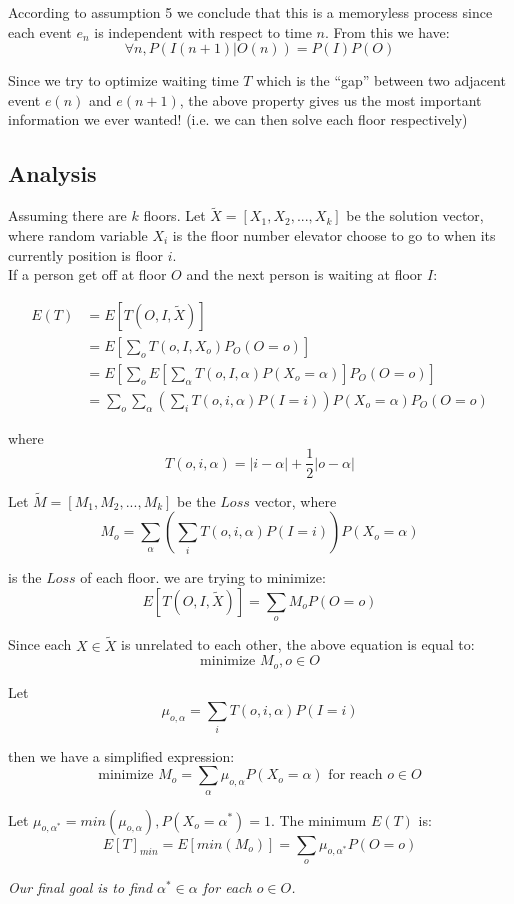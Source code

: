 \documentclass[11pt]{article}
\begin{document}
According to assumption 5 we conclude that this is a memoryless process since each event $e_n$ is independent with respect to time $n$. From this we have:
$$\forall n, P(I(n+1)|O(n))=P(I)P(O)$$

Since we try to optimize waiting time $T$ which is the ``gap'' between two adjacent event $e(n)$ and $e(n+1)$, the above property gives us the most important information we ever wanted! (i.e. we can then solve each floor respectively)

\subsection{Analysis}
Assuming there are $k$ floors. Let $\tilde{X}=[X_1,X_2,...,X_k]$ be the solution vector, where random variable $X_i$ is the floor number elevator choose to go to when its currently position is floor $i$.\\

If a person get off at floor $O$ and the next person is waiting at floor $I$:

\begin{align*}
E(T)&=E[T(O,I,\tilde{X})]\\
&=E[\sum_oT(o,I,X_o)P_O(O=o)]\\
&=E[\sum_o E[\sum_\alpha T(o,I,\alpha) P(X_o=\alpha)]P_O(O=o)]\\
&=\sum_o \sum_\alpha (\sum_iT(o,i,\alpha)P(I=i))P(X_o=\alpha)P_O(O=o)
\end{align*}

where
$$T(o,i,\alpha)=|i-\alpha|+\frac{1}{2}|o-\alpha|$$

Let $\tilde{M}=[M_1,M_2,...,M_k]$ be the $Loss$ vector, where
$$M_o=\sum_\alpha (\sum_iT(o,i,\alpha)P(I=i))P(X_o=\alpha)$$

is the $Loss$ of each floor. we are trying to minimize:
$$E[T(O,I,\tilde{X})]=\sum_oM_oP(O=o)$$

Since each $X \in \tilde{X}$ is unrelated to each other, the above equation is equal to:
$$\text{minimize } M_o, o\in O$$

Let $$\mu_{o,\alpha} = \sum_iT(o,i,\alpha)P(I=i)$$

then we have a simplified expression:
$$\text{minimize }M_o=\sum_\alpha \mu_{o,\alpha} P(X_o=\alpha) \text{ for reach } o\in O$$

Let $\mu_{o,\alpha^*}=min(\mu_{o,\alpha}),P(X_o=\alpha^*)=1$. The minimum $E(T)$ is:
$$E[T]_{min}=E[min(M_o)]=\sum_o\mu_{o,\alpha^*}P(O=o)$$

\emph{Our final goal is to find $\alpha^* \in \alpha$ for each $o \in O$.}
\end{document}
